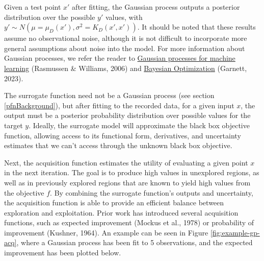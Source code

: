 \documentclass[12pt,twoside]{reedthesis}
\begin{document}
Given a test point \(x'\) after fitting, the Gaussian process outputs a posterior distribution over the possible \(y'\) values, with \(y'\sim N(\mu=\mu_D(x'), \sigma^2=K_D(x',x'))\). It should be noted that these results assume no observational noise, although it is not difficult to incorporate more general assumptions about noise into the model. For more information about Gaussian processes, we refer the reader to \underline{Gaussian processes for machine learning} (Rasmussen \& Williams, 2006) and \underline{Bayesian Optimization} (Garnett, 2023).

The surrogate function need not be a Gaussian process (see section \ref{pfnBackground}), but after fitting to the recorded data, for a given input \(x\), the output must be a posterior probability distribution over possible values for the target \(y\). Ideally, the surrogate model will approximate the black box objective function, allowing access to its functional form, derivatives, and uncertainty estimates that we can't access through the unknown black box objective.

Next, the acquisition function estimates the utility of evaluating a given point \(x\) in the next iteration. The goal is to produce high values in unexplored regions, as well as in previously explored regions that are known to yield high values from the objective \(f\). By combining the surrogate function's outputs and uncertainty, the acquisition function is able to provide an efficient balance between exploration and exploitation. Prior work has introduced several acquisition functions, such as expected improvement (Mockus et al., 1978) or probability of improvement (Kushner, 1964). An example can be seen in Figure \ref{fig:example-gp-acq}, where a Gaussian process has been fit to 5 observations, and the expected improvement has been plotted below.
\end{document}
